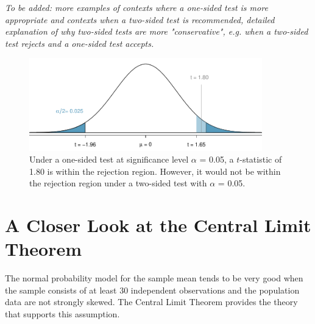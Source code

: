 \begin{spacing}{1.5}

\textit{To be added: more examples of contexts where a one-sided test is more appropriate and contexts when a two-sided test is recommended, detailed explanation of why two-sided tests are more "conservative", e.g. when a two-sided test rejects and a one-sided test accepts.} 


\begin{figure}[h]
	\centering
	\includegraphics[width=0.9\textwidth]
	{ch_inference_foundations_oi_biostat/figures/twoSidedTestConservative/twoSidedTestConservative}
	\caption{Under a one-sided test at significance level $\alpha$ = 0.05, a $t$-statistic of 1.80 is within the rejection region. However, it would not be within the rejection region under a two-sided test with $\alpha$ = 0.05.}
	\label{twoSidedTestConservative}
\end{figure}

\section[A Closer Look at the Central Limit Theorem]{A Closer Look at the Central Limit Theorem} %
\label{cltSection}


The normal probability model for the sample mean tends to be very good when the sample consists of at least 30 independent observations and the population data are not strongly skewed. The Central Limit Theorem provides the theory that supports this assumption.


\end{spacing}
